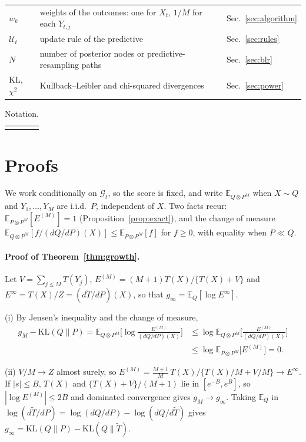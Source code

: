 \documentclass[pdflatex,sn-mathphys-ay]{sn-jnl}
\newcommand{\E}{\mathbb{E}}
\newcommand{\KL}{\mathrm{KL}}
\newcommand{\G}{\mathcal{G}}
\theoremstyle{thmstyleone}
\theoremstyle{thmstyletwo}
\begin{document}
\begin{appendices}
{\begin{tabular}{lll}
$w_k$ & weights of the outcomes: one for $X_t$, $1/M$ for each $Y_{t,j}$ & Sec.~\ref{sec:algorithm} \\
$\mathcal U_t$ & update rule of the predictive & Sec.~\ref{sec:rules} \\
$N$ & number of posterior nodes or predictive-resampling paths & Sec.~\ref{sec:blr} \\
\midrule
$\KL$, $\chi^2$ & Kullback--Leibler and chi-squared divergences & Sec.~\ref{sec:power} \\
\bottomrule
\end{tabular}}%
\begin{table}[h]
\centering
\caption{Notation. }
\label{tab:notation}
\begin{tabular}{@{}c@{}}\resizebox{\textwidth}{!}{\usebox{\widetab}}\end{tabular}
\end{table}


\section{Proofs}\label{app:proofs}

We work conditionally on $\G_t$, so the score is fixed, and write
$\E_{Q\otimes P^M}$ when $X \sim Q$ and $Y_1, \ldots, Y_M$ are i.i.d.\ $P$,
independent of $X$. Two facts recur: $\E_{P\otimes P^M}[E^{(M)}] = 1$
(Proposition~\ref{prop:exact}), and the change of measure
$\E_{Q\otimes P^M}[f/(dQ/dP)(X)] \le \E_{P\otimes P^M}[f]$ for $f \ge 0$, with
equality when $P \ll Q$.

\paragraph{Proof of Theorem~\ref{thm:growth}.}
Let $V = \sum_{j \le M} T(Y_j)$, $E^{(M)} = (M+1)T(X)/\{T(X)+V\}$ and
$E^\infty = T(X)/Z = (d\tilde T/dP)(X)$, so that $g_\infty = \E_Q[\log E^\infty]$.

(i) By Jensen's inequality and the change of measure,
\[
\begin{aligned}
g_M - \KL(Q\|P) = \E_{Q \otimes P^M}\Big[\log\frac{E^{(M)}}{(dQ/dP)(X)}\Big]
&\le \log \E_{Q \otimes P^M}\Big[\frac{E^{(M)}}{(dQ/dP)(X)}\Big] \\
&\le \log \E_{P \otimes P^M}\big[E^{(M)}\big] = 0 .
\end{aligned}
\]

(ii) $V/M \to Z$ almost surely, so
$E^{(M)} = \frac{M+1}{M}\,T(X)/\{T(X)/M + V/M\} \to E^\infty$. If $|s| \le B$,
$T(X)$ and $\{T(X)+V\}/(M+1)$ lie in $[e^{-B}, e^{B}]$, so
$|\log E^{(M)}| \le 2B$ and dominated convergence gives $g_M \to g_\infty$.
Taking $\E_Q$ in $\log(d\tilde T/dP) = \log(dQ/dP) - \log(dQ/d\tilde T)$ gives
$g_\infty = \KL(Q\|P) - \KL(Q\|\tilde T)$.


\end{appendices}
\end{document}
